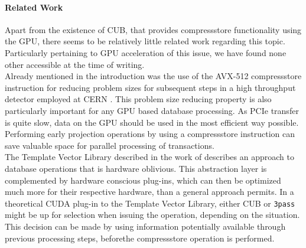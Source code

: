 \documentclass{tudscrreprt}
\begin{document}
		\paragraph{Related Work} Apart from the existence of CUB, that provides compressstore functionality using the GPU, there seems to be relatively little related work regarding this topic. Particularly pertaining to GPU acceleration of this issue, we have found none other accessible at the time of writing. \\
		Already mentioned in the introduction was the use of the AVX-512 compressstore instruction for reducing problem sizes for subsequent steps in a high throughput detector employed at CERN \cite{cern_datastreaming}. This problem size reducing property is also particularly important for any GPU based database processing. As PCIe transfer is quite slow, data on the GPU should be used in the most efficient way possible. Performing early projection operations by using a compressstore instruction can save valuable space for parallel processing of transactions. \\
		The Template Vector Library described in the work of \citeauthor{tvl} \cite{tvl} describes an approach to database operations that is hardware oblivious. This abstraction layer is complemented by hardware conscious plug-ins, which can then be optimized much more for their respective hardware, than a general approach permits. In a theoretical CUDA plug-in to the Template Vector Library, either CUB or \texttt{3pass} might be up for selection when issuing the operation, depending on the situation. This decision can be made by using information potentially available through previous processing steps, beforethe compressstore operation is performed. \\
\end{document}
